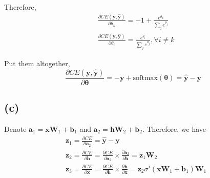 \documentclass[12pt]{article}
\begin{document}
Therefore, 
\begin{align*}
&\frac{\partial CE(\bm y, \bm {\hat y})} {\partial \theta_k} = -1 + \frac{e^{\theta_k}}{\sum_j e^{\theta_j}}  \\
&\frac{\partial CE(\bm y, \bm {\hat y})} {\partial \theta_i} =  \frac{e^{\theta_i}}{\sum_j e^{\theta_j}}, \forall i \neq k
\end{align*}

Put them altogether,
$$
\frac{\partial CE(\bm y, \bm {\hat y})} {\partial \bm \theta} = -\bm y + \text{softmax}(\bm {\theta}) = \bm {\hat y} - \bm y
$$

\subsection*{(c)}
Denote $\bm a_1 = \bm x \bm W_1 + \bm b_1$ and $\bm a_2 = \bm h \bm W_2 + \bm b_2$. Therefore, we have
\begin{align*}
& \bm z_1 = \frac{\partial CE}{\partial \bm a_2} = \bm {\hat y} - \bm y \\
& \bm z_2 = \frac{\partial CE}{\partial \bm h} = \frac{\partial CE}{\partial \bm a_2} \times \frac{\partial \bm a_2} {\partial \bm h} = \bm z_1 \bm W_2 \\
& \bm z_3 = \frac{\partial CE}{\partial \bm x} = \frac{\partial CE}{\partial \bm h} \times \frac{\partial \bm h}{\partial \bm x} = \bm z_2 \sigma'(\bm x \bm W_1 + \bm b_1) \bm W_1
\end{align*}

	
\end{document}
